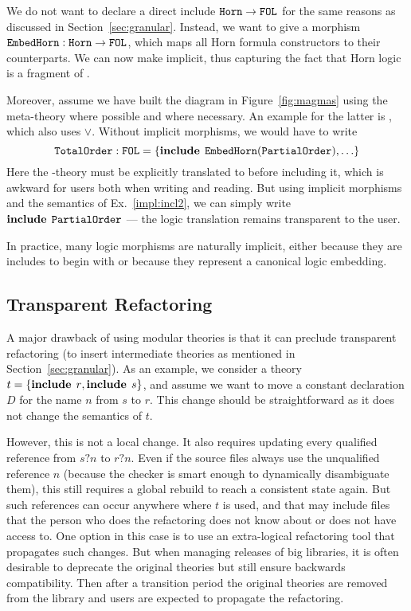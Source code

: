 We do not want to declare a direct include $\operatorname{\mathtt{Horn}}\to\operatorname{\mathtt{FOL}}$ for the same reasons as discussed in  Section~\ref{sec:granular}.
Instead, we want to give a morphism $\operatorname{\mathtt{EmbedHorn}}:\operatorname{\mathtt{Horn}}\to\operatorname{\mathtt{FOL}}$, which maps all Horn formula constructors to their  counterparts.
We can now make  implicit, thus capturing the fact that Horn logic is a fragment of .

Moreover, assume we have built the diagram in Figure~\ref{fig:magmas} using the meta-theory  where possible and  where necessary.
An example for the latter is , which also uses $\vee$.
Without implicit morphisms, we would have to write
\[\operatorname{\mathtt{TotalOrder}}:\operatorname{\mathtt{FOL}}=\{\operatorname{\mathbf{include}}{\;\operatorname{\mathtt{EmbedHorn}}(\operatorname{\mathtt{PartialOrder}})},\ldots\}\]
Here the -theory  must be explicitly translated to  before including it, which is awkward for users both when writing and reading.
But using implicit morphisms and the semantics of Ex.~\ref{impl:incl2}, we can simply write $\operatorname{\mathbf{include}}{\;\operatorname{\mathtt{PartialOrder}}}$ --- the logic translation remains transparent to the user.

In practice, many logic morphisms are naturally implicit, either because they are includes to begin with or because they represent a canonical logic embedding.

\subsection{Transparent Refactoring}

A major drawback of using modular theories is that it can preclude transparent refactoring (to insert intermediate theories as mentioned in Section~\ref{sec:granular}).
As an example, we consider a theory $t=\{\operatorname{\mathbf{include}}{\;r},\operatorname{\mathbf{include}}{\;s}\}$, and assume we want to move a constant declaration $D$ for the name $n$ from $s$ to $r$.
This change should be straightforward as it does not change the semantics of $t$.

However, this is not a local change.
It also requires updating every qualified reference from $s?n$ to $r?n$.
Even if the source files always use the unqualified reference $n$ (because the checker is smart enough to dynamically disambiguate them), this still requires a global rebuild to reach a consistent state again.
But such references can occur anywhere where $t$ is used, and that may include files that the person who does the refactoring does not know about or does not have access to.
One option in this case is to use an extra-logical refactoring tool that propagates such changes.
But when managing releases of big libraries, it is often desirable to deprecate the original theories but still ensure backwards compatibility.
Then after a transition period the original theories are removed from the library and users are expected to propagate the refactoring.

